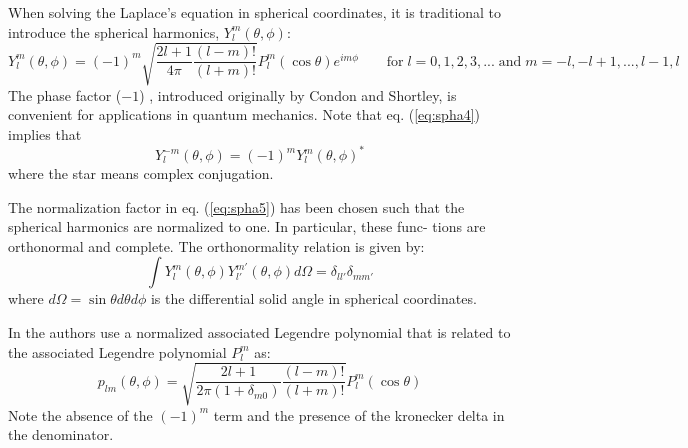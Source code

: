 When solving the Laplace’s equation in spherical coordinates, it is traditional
to introduce the spherical harmonics, $Y_l^m(\theta,\phi)$:
\begin{equation}
Y_l^m(\theta,\phi) = (-1)^m \sqrt{\frac{2l+1}{4\pi} \frac{(l-m)!}{(l+m)!}} P_l^m(\cos\theta) e^{im\phi}
\qquad 
\textrm{for} \; l=0,1,2,3,... \; \textrm{and} \; m=-l,-l+1,...,l-1,l
\label{eq:spha5}
\end{equation}
The phase factor ($-1$) , introduced originally by Condon and Shortley, is convenient for
applications in quantum mechanics. Note that eq. (\ref{eq:spha4}) implies that
\[
Y_l^{-m} (\theta, \phi) = (-1)^m Y_l^m (\theta,\phi)^* 
\]
where the star means complex conjugation.

The normalization factor in eq. (\ref{eq:spha5}) has been
chosen such that the spherical harmonics are normalized to one. In particular, these func-
tions are orthonormal and complete. The orthonormality relation is given by:
\[
\int Y_l^m(\theta,\phi) Y_{l'}^{m'}(\theta,\phi) d\Omega = \delta_{ll'} \delta_{mm'}
\]
where $d\Omega = \sin\theta d\theta d\phi$ is the differential solid angle in spherical coordinates.



\begin{remark}
In \cite{zhmt08} the authors use a normalized associated Legendre
polynomial that is related to the associated Legendre polynomial $P_l^m$ as:
\[
p_{lm}(\theta,\phi) = \sqrt{\frac{2l+1}{2\pi(1+\delta_{m0})} \frac{(l-m)!}{(l+m)!}} P_l^m(\cos\theta)
\]
Note the absence of the $(-1)^m$ term and the presence of the kronecker delta in the denominator.
\end{remark}


\Literature \cite{crms06}
